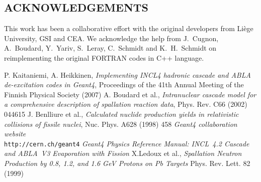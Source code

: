 \documentclass[20pt]{article}
\newenvironment{textbox}
{\begin{lrbox}{\dummybox}\begin{minipage}{0.9\columnwidth}}
{\end{minipage}\end{lrbox}\raisebox{-\depth}{\psshadowbox[framesep=1em,framearc=.1,shadow=true]{\usebox{\dummybox}}}\vspace{0.005\textheight}}
\begin{document}
\begin{center}
\begin{multicols}{3}
\begin{textbox}


\section*{{\Huge {\sf ACKNOWLEDGEMENTS}}}

This work has been a collaborative effort with the original developers from
Li\`ege University, GSI and CEA. We acknowledge the help from J.~Cugnon,
A.~Boudard, Y.~Yariv, S.~Leray, C.~Schmidt and K.~H.~Schmidt
on reimplementing the original {\sf FORTRAN} codes in {\sf C++} language.

\end{textbox}
\vskip2cm
\begin{textbox}

{\Large
{}
\begin{thebibliography}{9}
 P. Kaitaniemi, A. Heikkinen, \emph{Implementing INCL4
    hadronic cascade and ABLA de-excitation codes in Geant4},
  Proceedings of the 41th Annual Meeting of the Finnish Physical
  Society (2007)
 A. Boudard et al., \emph{Intranuclear cascade model for
    a comprehensive description of spallation reaction data}, Phys.
  Rev. C66 (2002) 044615
 J. Benlliure et al., \emph{Calculated nuclide
    production yields in relativistic collisions of fissile nuclei},
  Nuc. Phys. A628 (1998) 458
 \emph{Geant4 collaboration website} \\ {\tt http://\-cern.ch/\-geant4}
 \emph{Geant4 Physics Reference Manual: INCL~4.2 Cascade and ABLA~V3 Evaporation with Fission} 
 X.Ledoux et al., \emph{Spallation Neutron Production by
  0.8, 1.2, and 1.6 GeV Protons on Pb Targets} Phys. Rev. Lett. 82
  (1999)
%
%
\end{thebibliography}
}

\end{textbox}

\end{multicols}

\end{center}
\end{document}
